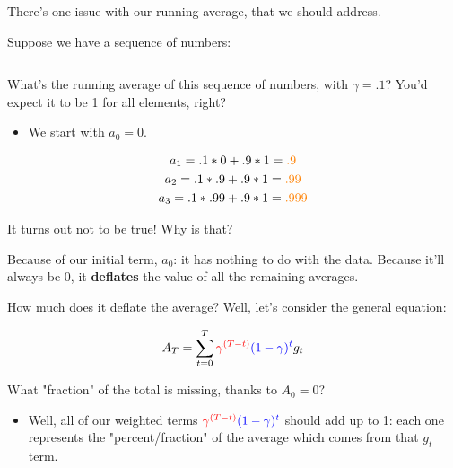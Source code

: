             There's one issue with our running average, that we should address.

            Suppose we have a sequence of numbers:

            \begin{equation}
                [1,1,1]
            \end{equation}

            What's the running average of this sequence of numbers, with $\gamma=.1$? You'd expect it to be 1 for all elements, right?

            \begin{itemize}
                \item We start with $a_0=0$.
            \end{itemize}

            \begin{equation}
                \begin{gathered}
                    a_1 = .1*0 + .9*1 = \textcolor{orange}{.9} \\
                    a_2 = .1*.9+ .9*1 = \textcolor{orange}{.99} \\
                    a_3 = .1*.99+ .9*1 = \textcolor{orange}{.999}
                \end{gathered}
            \end{equation}

            It turns out not to be true! Why is that?

            Because of our initial term, $a_0$: it has nothing to do with the data. Because it'll always be 0, it \textbf{deflates} the value of all the remaining averages.

            How much does it deflate the average? Well, let's consider the general equation:

            \begin{equation}
                A_T = \sum_{t=0}^T \textcolor{red}{\gamma^{(T-t)}} \textcolor{blue}{(1-\gamma)^t} g_t
            \end{equation}

            What "fraction" of the total is missing, thanks to $A_0=0$? 
            
            \begin{itemize}
                \item Well, all of our weighted terms $\textcolor{red}{\gamma^{(T-t)}} \textcolor{blue}{(1-\gamma)^t}$ should add up to 1: each one represents the "percent/fraction" of the average which comes from that $g_t$ term.
            \end{itemize}

